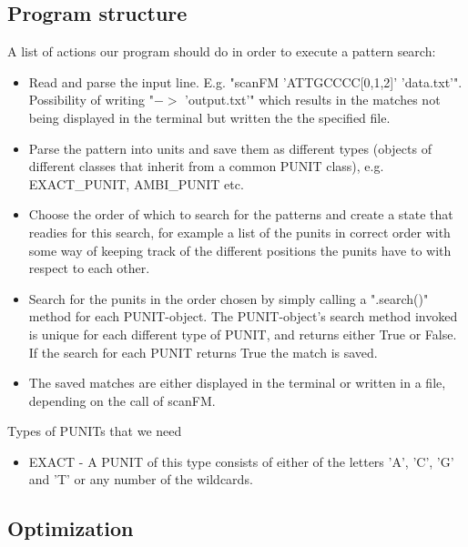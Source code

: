 \documentclass[12pt]{article}
\begin{document}
\subsection{Program structure}
A list of actions our program should do in order to execute a pattern search:
\begin{itemize}
\item Read and parse the input line. E.g. "scanFM 'ATTGCCCC[0,1,2]' 'data.txt'". Possibility of writing "$->$ 'output.txt'"
which results in the matches not being displayed in the terminal but written the the specified file.
\item Parse the pattern into units and save them as different types (objects of different classes that inherit
from a common PUNIT class), e.g. EXACT\_PUNIT, AMBI\_PUNIT etc.
\item Choose the order of which to search for the patterns and create a state that readies for this search, for example a 
list of the punits in correct order with some way of keeping track of the different positions the punits have to with
respect to each other.
\item Search for the punits in the order chosen by simply calling a ".search()" method for each PUNIT-object.
The PUNIT-object's search method invoked is unique for each different type of PUNIT, and returns either True or False.
If the search for each PUNIT returns True the match is saved.
\item The saved matches are either displayed in the terminal or written in a file, depending on the call of scanFM. 
\end{itemize}
Types of PUNITs that we need
\begin{itemize}
\item EXACT - A PUNIT of this type consists of either of the letters 'A', 'C', 'G' and 'T' or any number of the wildcards.
\end{itemize}

\subsection{Optimization}
\end{document}
